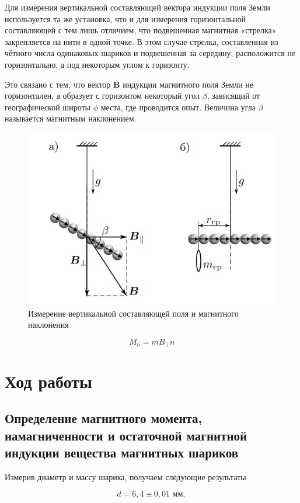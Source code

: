\documentclass[a4paper, 12pt]{article}%
\begin{document}
Для измерения вертикальной составляющей вектора индукции поля Земли используется та же установка, что и для измерения горизонтальной составляющей с тем лишь отличием, что подвешенная магнитная «стрелка» закрепляется на нити в одной точке. В этом случае стрелка, составленная из чётного числа одинаковых шариков и подвешенная за середину, расположится не горизонтально, а под некоторым углом к горизонту.

Это связано с тем, что вектор $\textbf{B}$ индукции магнитного поля Земли не горизонтален, а образует с горизонтом
некоторый угол $\beta$, зависящий от географической широты $\phi$ места, где проводится опыт. Величина угла $\beta$ называется магнитным наклонением.

\begin{figure}[h]
    \centering
    \includegraphics[width = 10 cm]{3.jpg}
    \caption{Измерение вертикальной составляющей поля и магнитного наклонения}
    \label{way3}
\end{figure}

\begin{equation}
    M_n = m B_{\perp} n
\end{equation}

\section{Ход работы}

\subsection{Определение магнитного момента, намагниченности и остаточной магнитной индукции вещества магнитных шариков}

Измерив диаметр и массу шарика, получаем следующие результаты

\[ 	d =	6,4 \pm 0,01 \text{ мм}	  ,\]
\end{document}
